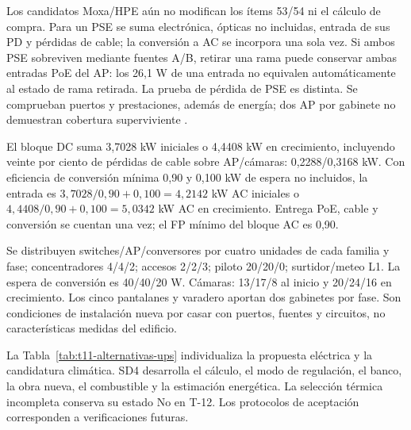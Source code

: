 Los candidatos Moxa/HPE aún no modifican los ítems 53/54 ni el cálculo de compra. Para un PSE se suma electrónica, ópticas no incluidas, entrada de sus PD y pérdidas de cable; la conversión a AC se incorpora una sola vez. Si ambos PSE sobreviven mediante fuentes A/B, retirar una rama puede conservar ambas entradas PoE del AP: los 26,1 W de una entrada no equivalen automáticamente al estado de rama retirada. La prueba de pérdida de PSE es distinta. Se comprueban puertos y prestaciones, además de energía; dos AP por gabinete no demuestran cobertura superviviente \parencites{p5-moxa-candidato}{p5-aruba-candidato}.

El bloque DC suma 3,7028 kW iniciales o 4,4408 kW en crecimiento, incluyendo veinte por ciento de pérdidas de cable sobre AP/cámaras: 0,2288/0,3168 kW. Con eficiencia de conversión mínima 0,90 y 0,100 kW de espera no incluidos, la entrada es $3,7028/0,90+0,100=4,2142$ kW AC iniciales o $4,4408/0,90+0,100=5,0342$ kW AC en crecimiento. Entrega PoE, cable y conversión se cuentan una vez; el FP mínimo del bloque AC es 0,90.

Se distribuyen switches/AP/conversores por cuatro unidades de cada familia y fase; concentradores 4/4/2; accesos 2/2/3; piloto 20/20/0; surtidor/meteo L1. La espera de conversión es 40/40/20 W. Cámaras: 13/17/8 al inicio y 20/24/16 en crecimiento. Los cinco pantalanes y varadero aportan dos gabinetes por fase. Son condiciones de instalación nueva por casar con puertos, fuentes y circuitos, no características medidas del edificio.

La Tabla~\ref{tab:t11-alternativas-ups} individualiza la propuesta eléctrica y la candidatura climática. SD4 desarrolla el cálculo, el modo de regulación, el banco, la obra nueva, el combustible y la estimación energética. La selección térmica incompleta conserva su estado No en T-12. Los protocolos de aceptación corresponden a verificaciones futuras.


